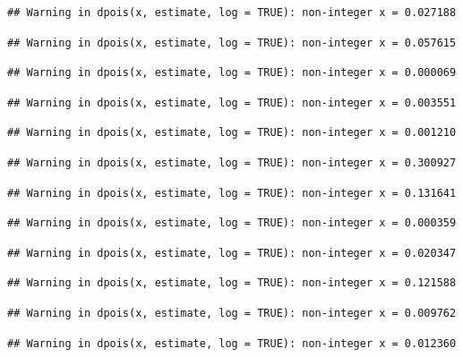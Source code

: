 \documentclass[]{article}
\begin{document}
\begin{verbatim}
## Warning in dpois(x, estimate, log = TRUE): non-integer x = 0.027188
\end{verbatim}

\begin{verbatim}
## Warning in dpois(x, estimate, log = TRUE): non-integer x = 0.057615
\end{verbatim}

\begin{verbatim}
## Warning in dpois(x, estimate, log = TRUE): non-integer x = 0.000069
\end{verbatim}

\begin{verbatim}
## Warning in dpois(x, estimate, log = TRUE): non-integer x = 0.003551
\end{verbatim}

\begin{verbatim}
## Warning in dpois(x, estimate, log = TRUE): non-integer x = 0.001210
\end{verbatim}

\begin{verbatim}
## Warning in dpois(x, estimate, log = TRUE): non-integer x = 0.300927
\end{verbatim}

\begin{verbatim}
## Warning in dpois(x, estimate, log = TRUE): non-integer x = 0.131641
\end{verbatim}

\begin{verbatim}
## Warning in dpois(x, estimate, log = TRUE): non-integer x = 0.000359
\end{verbatim}

\begin{verbatim}
## Warning in dpois(x, estimate, log = TRUE): non-integer x = 0.020347
\end{verbatim}

\begin{verbatim}
## Warning in dpois(x, estimate, log = TRUE): non-integer x = 0.121588
\end{verbatim}

\begin{verbatim}
## Warning in dpois(x, estimate, log = TRUE): non-integer x = 0.009762
\end{verbatim}

\begin{verbatim}
## Warning in dpois(x, estimate, log = TRUE): non-integer x = 0.012360
\end{verbatim}
\end{document}
